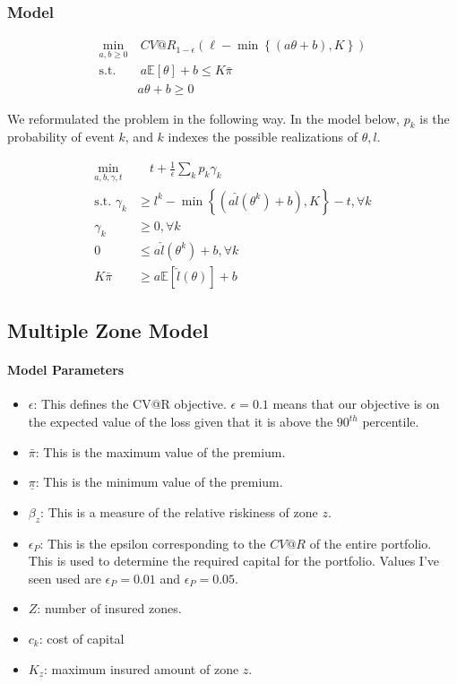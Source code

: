 \documentclass[11pt]{article}
\begin{document}
\subsubsection*{Model}
\begin{align}
    \min_{a,b\geq 0} &\ CV@R_{1-\epsilon}\left(\ell  - \min\left\{(a\theta + b), K\right\} \right)\\
    \text{s.t.   } &\   a \mathbb{E} \left[\theta \right] + b\label{eq-02} \leq K\bar{\pi}\\
     & a\theta + b \geq 0 
\end{align}

We reformulated the problem in the following way. In the model below, $p_k$ is the probability of event $k$, and $k$ indexes the possible realizations of $\theta, l$.

\begin{align}
    \min_{a,b,\gamma,t} &\quad t + \frac{1}{\epsilon}\sum_k p_k \gamma_k\\
    \text{s.t.   } \gamma_k &\geq l^k - \min\left\{(a\hat{l}(\theta^k) + b), K\right\} - t, \forall k\\
    \gamma_k &\geq 0, \forall k \\
    0 &\leq a\hat{l}(\theta^k) + b, \forall k\\
    K\bar{\pi} &\geq a\mathbb{E}[\hat{l}(\theta)] + b
\end{align}

\subsection*{Multiple Zone Model}
\paragraph*{Model Parameters}
    \begin{itemize}
        \item $\epsilon$: This defines the CV@R objective. $\epsilon = 0.1$ means that our objective is on the expected value of the loss given that it is above the $90^{th}$ percentile. 
        \item $\bar{\pi}$: This is the maximum value of the premium. 
        \item $\underline{\pi}$: This is the minimum value of the premium. 
        \item $\beta_z$: This is a measure of the relative riskiness of zone $z$. 
        \item $\epsilon_P$: This is the epsilon corresponding to the $CV@R$ of the entire portfolio. This is used to determine the required capital for the portfolio. Values I've seen used are $\epsilon_P=0.01$ and $\epsilon_P=0.05$. 
        \item $Z$: number of insured zones.
        \item $c_k$: cost of capital
        \item $K_z$: maximum insured amount of zone $z$.  
    \end{itemize}
\end{document}
